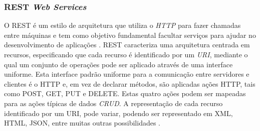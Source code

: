 \subsubsection{ REST \textit{Web Services}}
O \gls{REST} é um estilo de arquitetura que utiliza o \textit{\gls{HTTP}} para fazer chamadas entre máquinas e tem como objetivo fundamental facultar serviços para ajudar no desenvolvimento de aplicações \cite{whatisrest}.
\gls{REST} caracteriza uma arquitetura centrada em recursos, especificando que cada recurso é identificado por um \textit{\gls{URI}}, mediante o qual um conjunto de operações pode ser aplicado através de uma interface uniforme. Esta interface padrão uniforme para a comunicação entre servidores e clientes é o \gls{HTTP} e, em vez de declarar métodos, são aplicadas ações \gls{HTTP}, tais como POST, GET, PUT e DELETE. Estas quatro ações podem ser mapeadas para as ações típicas de dados \textit{\gls{CRUD}}. A representação de cada recurso identificado por um URI, pode variar, podendo ser representado em \gls{XML}, \gls{HTML}, \gls{JSON}, entre muitas outras possibilidades \cite{restwebservices}.




